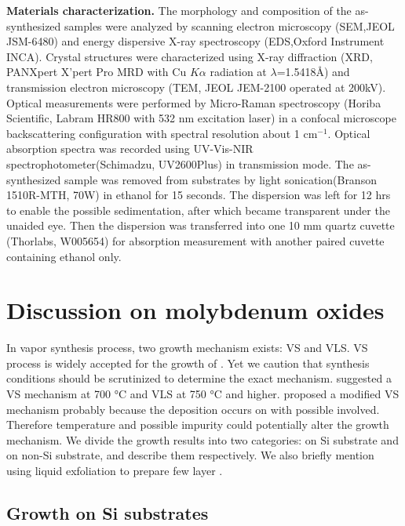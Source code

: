 \textbf{Materials characterization.} The morphology and composition of the as-synthesized samples were analyzed by scanning electron microscopy (SEM,JEOL JSM-6480) and energy dispersive X-ray spectroscopy (EDS,Oxford Instrument INCA). Crystal structures were characterized using X-ray diffraction (XRD, PANXpert X’pert Pro MRD with Cu $K\alpha$ radiation at $\lambda$=1.5418\AA) and transmission electron microscopy (TEM, JEOL JEM-2100  operated at 200kV). Optical measurements were performed by Micro-Raman spectroscopy (Horiba Scientific, Labram HR800 with 532 nm excitation laser) in a confocal microscope backscattering configuration with spectral resolution about 1 cm$^{-1}$. Optical absorption spectra was recorded using UV-Vis-NIR spectrophotometer(Schimadzu, UV2600Plus) in transmission mode. The as-synthesized sample was removed from substrates by light sonication(Branson 1510R-MTH, 70W) in ethanol for 15 seconds. The dispersion was left for 12 hrs to enable the possible sedimentation, after which became transparent under the unaided eye. Then the dispersion was transferred into one 10 mm quartz cuvette (Thorlabs, W005654) for absorption measurement with another paired cuvette containing ethanol only.


\section{Discussion on molybdenum oxides}\label{sec:result}

In vapor synthesis process, two growth mechanism exists: VS and VLS. VS process is widely accepted for the growth of . Yet we caution that synthesis conditions should be scrutinized to determine the exact mechanism. \citeauthor{Li2002c} suggested a VS mechanism at 700 \si{\degreeCelsius} and VLS at 750 \si{\degreeCelsius} and higher.\cite{Li2002c} \citeauthor{Fibers2007} proposed a modified VS mechanism probably because the deposition occurs on  with possible  involved. Therefore temperature and possible impurity could potentially alter the growth mechanism. We divide the growth results into two categories: on Si substrate and on non-Si substrate, and describe them respectively. We also briefly mention using liquid exfoliation to prepare few layer .

\subsection{Growth on Si substrates}

